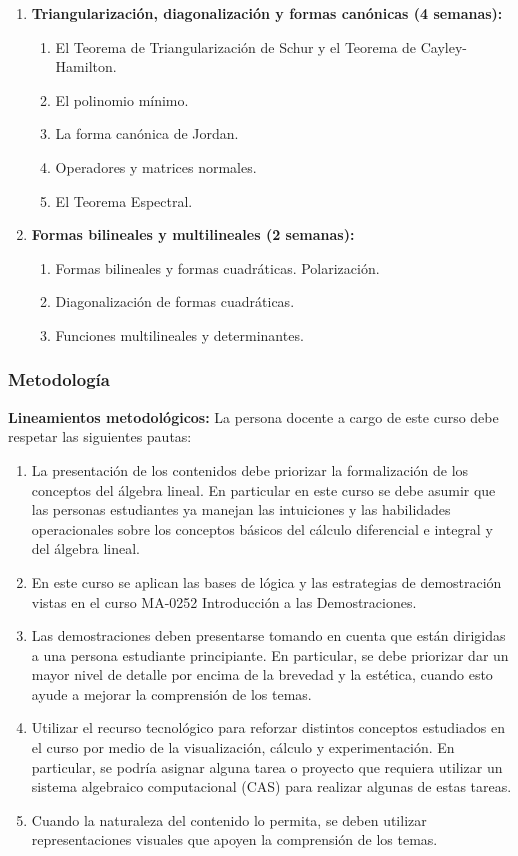\begin{refsection}
\begin{enumerate}
\item \textbf{Triangularización, diagonalización y formas canónicas (4 semanas):} 
\begin{enumerate}
    \item El Teorema de Triangularización de Schur y el Teorema de Cayley-Hamilton.
    \item El polinomio mínimo.
    \item La forma canónica de Jordan.
        \item Operadores y matrices normales.
    \item El Teorema Espectral.
\end{enumerate}

\item \textbf{Formas bilineales y multilineales (2 semanas):} 
\begin{enumerate}
    \item Formas bilineales y formas cuadráticas. Polarización.
    \item Diagonalización de formas cuadráticas.
    \item Funciones multilineales y determinantes.
\end{enumerate}

\end{enumerate}

\subsubsection*{Metodología}

\noindent \textbf{Lineamientos metodológicos:} La persona docente a cargo de este curso debe respetar las siguientes pautas:
\begin{enumerate}
    \item La presentación de los contenidos debe priorizar la formalización de los conceptos del álgebra lineal. En particular en este curso se debe asumir que las personas estudiantes  ya manejan las intuiciones y las habilidades operacionales sobre los conceptos básicos del cálculo diferencial e integral y del álgebra lineal.
    \item En este curso se aplican las bases de lógica y las estrategias de demostración vistas en el curso MA-0252 Introducción a las Demostraciones.
    \item Las demostraciones deben presentarse tomando en cuenta que están dirigidas a una persona estudiante principiante. En particular, se debe priorizar dar un mayor nivel de detalle por encima de la brevedad y la estética, cuando esto ayude a mejorar la comprensión de los temas.
    \item Utilizar el recurso tecnológico para reforzar distintos conceptos estudiados en el curso por medio de la visualización, cálculo y experimentación. En particular, se podría asignar alguna tarea o proyecto que requiera utilizar un sistema algebraico computacional (CAS) para realizar algunas de estas tareas.
    \item Cuando la naturaleza del contenido lo permita, se deben utilizar representaciones visuales que apoyen la comprensión de los temas.
\end{enumerate}


\end{refsection}
